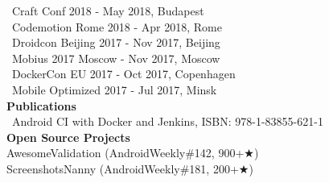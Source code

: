 \documentclass[12pt, a4paper]{article}
\begin{document}
\faMicrophone\ Craft Conf 2018 - May 2018, Budapest \\

\faMicrophone\ Codemotion Rome 2018 - Apr 2018, Rome \\

\faMicrophone\ Droidcon Beijing 2017 - Nov 2017, Beijing \\

\faMicrophone\ Mobius 2017 Moscow - Nov 2017, Moscow \\

\faMicrophone\ DockerCon EU 2017 - Oct 2017, Copenhagen \\

\faMicrophone\ Mobile Optimized 2017 - Jul 2017, Minsk \\

\textcolor{highlightblue}{\textbf{\huge Publications}} \\

\faBook\ Android CI with Docker and Jenkins, ISBN: 978-1-83855-621-1 \\

\textcolor{highlightblue}{\textbf{\huge Open Source Projects}} \\

AwesomeValidation (AndroidWeekly\#142, 900+{\DejaVuSans ★}) \\

ScreenshotsNanny (AndroidWeekly\#181, 200+{\DejaVuSans ★}) \\
\end{document}
